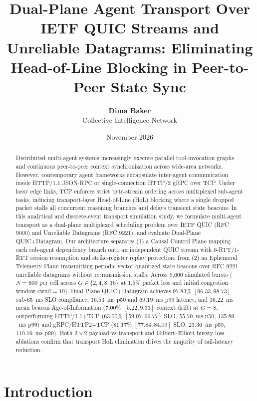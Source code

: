 \documentclass[11pt]{article}
\title{Dual-Plane Agent Transport Over IETF QUIC Streams and Unreliable Datagrams: Eliminating Head-of-Line Blocking in Peer-to-Peer State Sync}
\author{\textbf{Dima Baker}\\
Collective Intelligence Network}
\date{November 2026}
\begin{document}
\maketitle

\begin{abstract}
Distributed multi-agent systems increasingly execute parallel tool-invocation graphs and continuous peer-to-peer context synchronization across wide-area networks. However, contemporary agent frameworks encapsulate inter-agent communication inside HTTP/1.1 JSON-RPC or single-connection HTTP/2 gRPC over TCP. Under lossy edge links, TCP enforces strict byte-stream ordering across multiplexed sub-agent tasks, inducing transport-layer Head-of-Line (HoL) blocking where a single dropped packet stalls all concurrent reasoning branches and delays transient state beacons. In this analytical and discrete-event transport simulation study, we formulate multi-agent transport as a dual-plane multiplexed scheduling problem over IETF QUIC (RFC 9000) and Unreliable Datagrams (RFC 9221), and evaluate Dual-Plane QUIC+Datagram. Our architecture separates (1) a Causal Control Plane mapping each sub-agent dependency branch onto an independent QUIC stream with 0-RTT/1-RTT session resumption and strike-register replay protection, from (2) an Ephemeral Telemetry Plane transmitting periodic vector-quantized state beacons over RFC 9221 unreliable datagrams without retransmission stalls. Across 9{,}600 simulated bursts ($N=600$ per cell across $G \in \{2, 4, 8, 16\}$ at $1.5\%$ packet loss and initial congestion window $\mathrm{cwnd}=10$), Dual-Plane QUIC+Datagram achieves $97.83\%$ $[96.33, 98.73]$ sub-65~ms SLO compliance, $16.53$~ms p50 and $69.19$~ms p99 latency, and $16.22$~ms mean beacon Age-of-Information ($7.00\%$ $[5.22, 9.33]$ context drift) at $G=8$, outperforming HTTP/1.1+TCP ($63.00\%$ $[59.07, 66.77]$ SLO, $55.70$~ms p50, $135.89$~ms p99) and gRPC/HTTP2+TCP ($81.17\%$ $[77.84, 84.09]$ SLO, $23.36$~ms p50, $110.16$~ms p99). Both $2\times 2$ payload-vs-transport and Gilbert--Elliott bursty-loss ablations confirm that transport HoL elimination drives the majority of tail-latency reduction.
\end{abstract}

\section{Introduction}\label{sec:intro}
\end{document}
